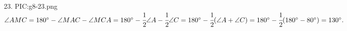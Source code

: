 23. {{PIC:g8-23.png}}\\
$\angle AMC=180^\circ-\angle MAC-\angle MCA=180^\circ-\cfrac{1}{2}\angle A-\cfrac{1}{2}\angle C=180^\circ-\cfrac{1}{2}(\angle A+\angle C)=
180^\circ-\cfrac{1}{2}(180^\circ-80^\circ)=130^\circ.$\\
